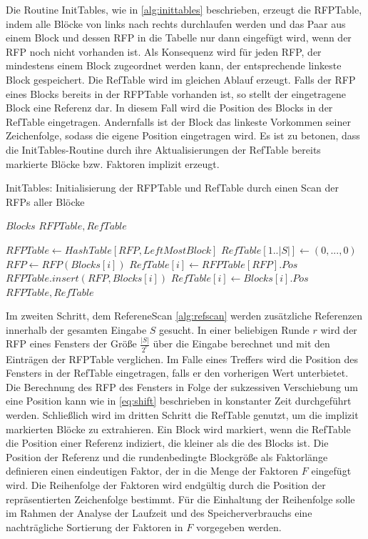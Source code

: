Die Routine InitTables, wie in \ref{alg:inittables} beschrieben, erzeugt die RFPTable, indem alle Blöcke von links nach rechts durchlaufen werden und das Paar aus einem Block und dessen RFP in die Tabelle
nur dann eingefügt wird, wenn der RFP noch nicht vorhanden ist. Als Konsequenz wird für jeden RFP, der mindestens einem Block zugeordnet werden kann, der entsprechende linkeste Block gespeichert. Die RefTable
wird im gleichen Ablauf erzeugt. Falls der RFP eines Blocks bereits in der RFPTable vorhanden ist, so stellt der eingetragene Block eine Referenz dar. In diesem Fall wird die Position des Blocks in der RefTable
eingetragen. Andernfalls ist der Block das linkeste Vorkommen seiner Zeichenfolge, sodass die eigene Position eingetragen wird. Es ist zu betonen, dass die InitTables-Routine durch ihre Aktualisierungen der 
RefTable bereits markierte Blöcke bzw. Faktoren implizit erzeugt.

\begin{algorithm}[ht]
    \centering
    \caption{InitTables: Initialisierung der RFPTable und RefTable durch einen Scan der RFPs aller Blöcke} \label{alg:inittables}
    \algorithmicrequire $Blocks$
    \algorithmicensure $RFPTable, RefTable$
    \begin{algorithmic}[1]
        \STATE $RFPTable \gets HashTable[RFP, LeftMostBlock]$
        \STATE $RefTable[1..|S|] \gets (0,...,0)$
            \STATE $RFP \gets RFP(Blocks[i])$
                \STATE $RefTable[i] \gets RFPTable[RFP].Pos$
            \ELSE
                \STATE $RFPTable.insert(RFP,Blocks[i])$
                \STATE $RefTable[i] \gets Blocks[i].Pos$
            \ENDIF
        \ENDFOR
        \RETURN $RFPTable, RefTable$
    \end{algorithmic}
\end{algorithm}

Im zweiten Schritt, dem RefereneScan \ref{alg:refscan} werden zusätzliche Referenzen innerhalb der gesamten Eingabe $S$ gesucht. In einer beliebigen Runde $r$ wird der RFP eines Fensters der Größe $\frac{|S|}{2^r}$ 
über die Eingabe berechnet und mit den Einträgen der RFPTable verglichen. Im Falle eines Treffers wird die Position des Fensters in der RefTable eingetragen, falls er den vorherigen Wert unterbietet. Die Berechnung
des RFP des Fensters in Folge der sukzessiven Verschiebung um eine Position kann wie in \ref{eq:shift} beschrieben in konstanter Zeit durchgeführt werden.
Schließlich wird im dritten Schritt die RefTable genutzt, um die implizit markierten Blöcke zu extrahieren. Ein Block wird markiert, wenn die RefTable die Position einer Referenz indiziert, die kleiner als die
des Blocks ist. Die Position der Referenz und die rundenbedingte Blockgröße als Faktorlänge definieren einen eindeutigen Faktor, der in die Menge der Faktoren $F$ eingefügt wird. Die Reihenfolge der Faktoren
wird endgültig durch die Position der repräsentierten Zeichenfolge bestimmt. Für die Einhaltung der Reihenfolge solle im Rahmen der Analyse der Laufzeit und des Speicherverbrauchs eine nachträgliche Sortierung
der Faktoren in $F$ vorgegeben werden.

